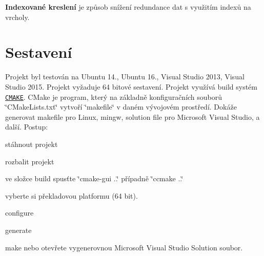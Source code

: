 {\bfseries Indexované kreslení} je způsob snížení redundance dat s využitím indexů na vrcholy. \hypertarget{index_sestaveni}{}\section{Sestavení}\label{index_sestaveni}
Projekt byl testován na Ubuntu 14., Ubuntu 16., Visual Studio 2013, Visual Studio 2015. Projekt vyžaduje 64 bitové sestavení. Projekt využívá build systém \href{https://cmake.org/}{\tt C\+M\+A\+KE}. C\+Make je program, který na základně konfiguračních souborů \char`\"{}\+C\+Make\+Lists.\+txt\char`\"{} vytvoří \char`\"{}makefile\char`\"{} v daném vývojovém prostředí. Dokáže generovat makefile pro Linux, mingw, solution file pro Microsoft Visual Studio, a další. Postup\+:
\begin{DoxyEnumerate}
\item stáhnout projekt
\item rozbalit projekt
\item ve složce build spusťte \char`\"{}cmake-\/gui ..\char`\"{} případně \char`\"{}ccmake ..\char`\"{}
\item vyberte si překladovou platformu (64 bit).
\item configure
\item generate
\item make nebo otevřete vygenerovnou Microsoft Visual Studio Solution soubor.
\end{DoxyEnumerate}

